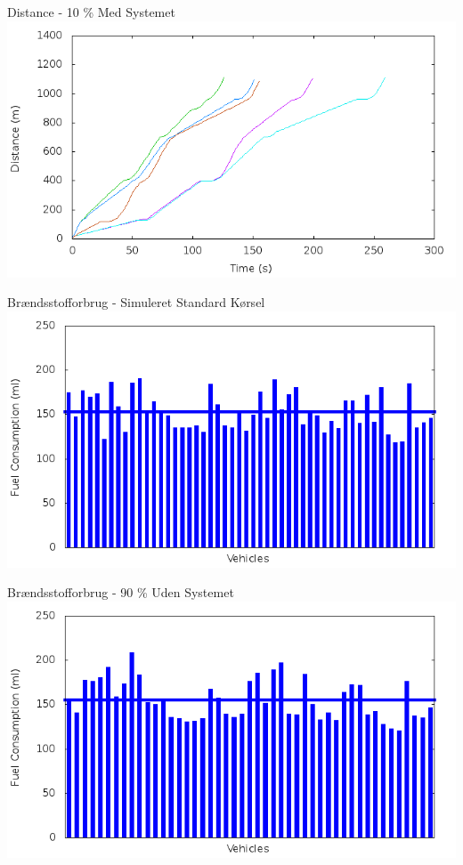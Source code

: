 \begin{frame}{Distance - 10 \% Med Systemet}
\includegraphics[width=1\textwidth]{images/distanceControlled10.png}
\end{frame}

\begin{frame}{Brændsstofforbrug - Simuleret Standard Kørsel}
\includegraphics[width=1\textwidth]{images/fuelRouteUncontrolled0.png}
\end{frame}


\begin{frame}{Brændsstofforbrug - 90 \% Uden Systemet}
\includegraphics[width=1\textwidth]{images/fuelRouteUncontrolled10.png}
\end{frame}

